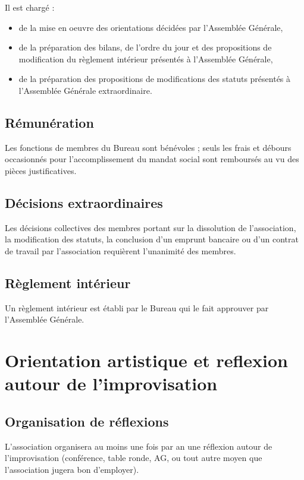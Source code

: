 \documentclass[a4paper,french,10pt]{article}
\begin{document}
Il est chargé :
\begin{itemize}
\item de la mise en oeuvre des orientations décidées par l'Assemblée
  Générale,

  \item de la préparation des bilans, de l'ordre du jour et des
  propositions de modification du règlement intérieur présentés à
  l'Assemblée Générale,

  \item de la préparation des propositions de modifications des statuts
  présentés à l'Assemblée Générale extraordinaire.
\end{itemize}


\subsection{Rémunération}
\label{sec:remuneration}
Les fonctions de membres du Bureau sont bénévoles ; seuls les frais et
débours occasionnés pour l’accomplissement du mandat social sont
remboursés au vu des pièces justificatives.

\subsection{Décisions extraordinaires}
\label{sec:decisions}
Les décisions collectives des membres portant sur la dissolution de
l’association, la modification des statuts, la conclusion d’un emprunt
bancaire ou d’un contrat de travail par l’association requièrent
l’unanimité des membres.

\subsection{Règlement intérieur}
\label{sec:reglement}
Un règlement intérieur est établi par le Bureau qui le fait approuver
par l’Assemblée Générale.



\section{Orientation artistique et reflexion autour de
  l'improvisation}

\subsection{Organisation de réflexions}
\label{sec:reflexions}
L'association organisera au moins une fois par an une réflexion autour
de l'improvisation (conférence, table ronde, AG, ou tout autre moyen
que l'association jugera bon d'employer).
\end{document}
